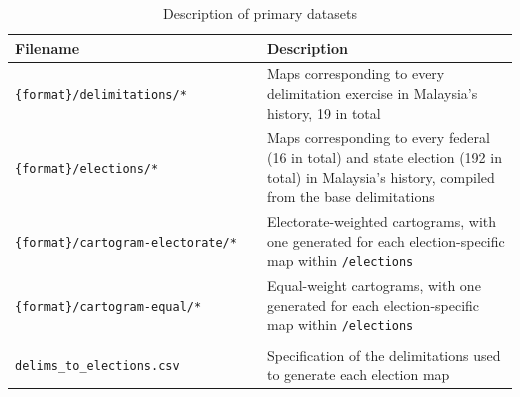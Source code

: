\documentclass[11pt]{article}
\begin{document}
\begin{table}[!htb]
	\centering
	\renewcommand{\arraystretch}{1.05}
	\caption{Description of primary datasets}
	\label{tab:data_records}
	\vspace{0.04in}
	\begin{tabular}{L{0.5\linewidth}L{0.5\linewidth}}
		\toprule
		\textbf{Filename}                                                                   & \textbf{Description}                                                                                                                            \\
		\midrule
		\texttt{\{format\}/delimitations/*}\linebreak                                       & Maps corresponding to every delimitation exercise in Malaysia's history, 19 in total                                                            \\[0.17in]
		\texttt{\{format\}/elections/*}\linebreak\phantom{a}\linebreak\phantom{a}\linebreak & Maps corresponding to every federal (16 in total) and state election (192 in total) in Malaysia's history, compiled from the base delimitations \\[0.43in]
		\texttt{\{format\}/cartogram-electorate/*}\linebreak\phantom{a}\linebreak           & Electorate-weighted cartograms, with one generated for each election-specific map within \texttt{/elections}                                    \\[0.3in]
		\texttt{\{format\}/cartogram-equal/*}\linebreak\phantom{a}\linebreak                & Equal-weight cartograms, with one generated for each election-specific map within \texttt{/elections}                                           \\[0.3in] \hline
		                                                                                    &                                                                                                                                                 \\[-0.14in]
		\texttt{delims\_to\_elections.csv}\linebreak                                        & Specification of the delimitations used to generate each election map                                                                           \\[0.17in]

\end{tabular}
\end{table}
\end{document}
